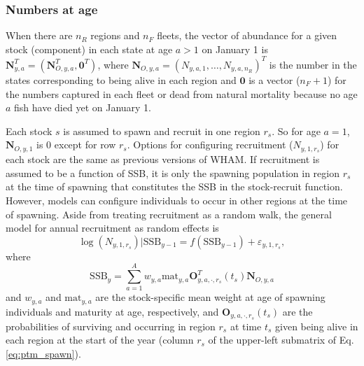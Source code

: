 \documentclass[
]{article}
\begin{document}
\hypertarget{numbers-at-age}{%
\subsubsection*{Numbers at age}\label{numbers-at-age}}

When there are \(n_R\) regions and \(n_F\) fleets, the vector of abundance for a given stock (component) in each state at age \(a>1\) on January 1 is \(\mathbf{N}_{y,a}^T = (\mathbf{N}_{O,y,a}^T, \mathbf{0}^T)\), where \(\mathbf{N}_{O,y,a} = (N_{y,a,1}, \ldots, N_{y,a,n_R})^T\) is the number in the states corresponding to being alive in each region and \(\mathbf{0}\) is a vector (\(n_F+1\)) for the numbers captured in each fleet or dead from natural mortality because no age \(a\) fish have died yet on January 1.

Each stock \(s\) is assumed to spawn and recruit in one region \(r_s\). So for age \(a=1\), \(\mathbf{N}_{O,y,1}\) is 0 except for row \(r_s\). Options for configuring recruitment (\(N_{y,1,r_s}\)) for each stock are the same as previous versions of WHAM. If recruitment is assumed to be a function of SSB, it is only the spawning population in region \(r_s\) at the time of spawning that constitutes the SSB in the stock-recruit function. However, models can configure individuals to occur in other regions at the time of spawning. Aside from treating recruitment as a random walk, the general model for annual recruitment as random effects is
\begin{equation*}
\log\left(N_{y,1,r_s}\right)|\text{SSB}_{y-1} =  f\left(\text{SSB}_{y-1}\right) + \varepsilon_{y,1,r_s},
\end{equation*}
where\\
\[\text{SSB}_{y} =  \sum^A_{a=1}  w_{y,a} \text{mat}_{y,a} \mathbf{O}_{y,a,\cdot,r_s}^T(t_s) \mathbf{N}_{O,y,a}\]
and \(w_{y,a}\) and \(\text{mat}_{y,a}\) are the stock-specific mean weight at age of spawning individuals and maturity at age, respectively, and \(\mathbf{O}_{y,a,\cdot,r_s}(t_s)\) are the probabilities of surviving and occurring in region \(r_s\) at time \(t_s\) given being alive in each region at the start of the year (column \(r_s\) of the upper-left submatrix of Eq. \ref{eq:ptm_spawn}).
\end{document}
